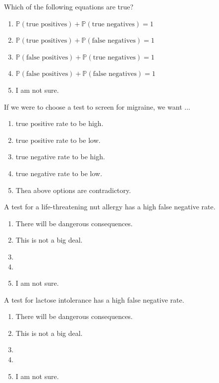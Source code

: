 \documentclass[aspectratio=169, t, 14pt]{beamer}
\begin{document}
\begin{poll}
  Which of the following equations are true?

  \begin{enumerate}
    \item \(\mathbb{P}(\text{true positives}) + \mathbb{P}(\text{true negatives}) = 1\)
    \item \(\mathbb{P}(\text{true positives}) + \mathbb{P}(\text{false negatives}) = 1\)
    \item \(\mathbb{P}(\text{false positives}) + \mathbb{P}(\text{true negatives}) = 1\)
    \item \(\mathbb{P}(\text{false positives}) + \mathbb{P}(\text{false negatives}) = 1\)
    \item I am not sure. 
  \end{enumerate}
\end{poll}

\begin{poll}
  If we were to choose a test to screen for migraine, we want ...

  \begin{enumerate}
    \item true positive rate to be high.
    \item true positive rate to be low.
    \item true negative rate to be high.
    \item true negative rate to be low.
    \item Thea above options are contradictory.
  \end{enumerate}
\end{poll}

\begin{poll}
  A test for a life-threatening nut allergy has a high false negative rate. 

  \begin{enumerate}
    \item There will be dangerous consequences.
    \item This is not a big deal.
    \item 
    \item 
    \item I am not sure.
  \end{enumerate}
\end{poll}

\begin{poll}
  A test for lactose intolerance has a high false negative rate. 

  \begin{enumerate}
    \item There will be dangerous consequences.
    \item This is not a big deal.
    \item 
    \item 
    \item I am not sure.
  \end{enumerate}
\end{poll}
\end{document}
